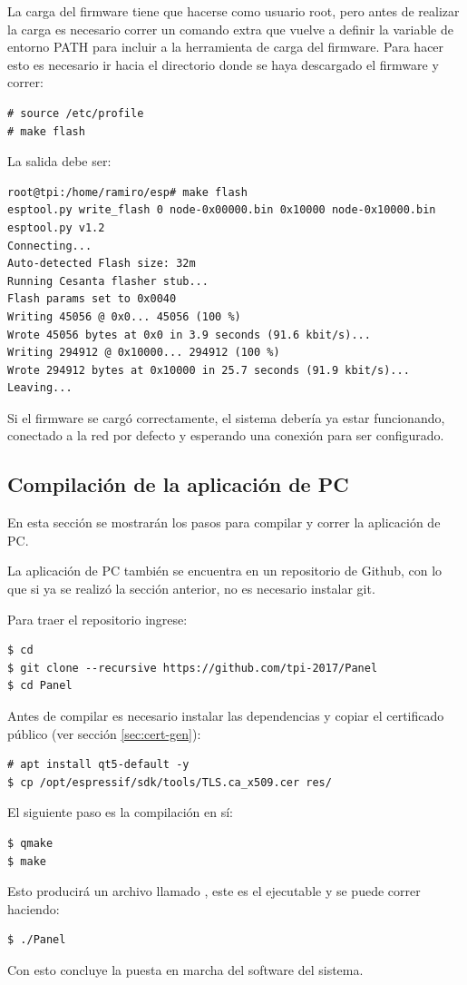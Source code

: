 La carga del firmware tiene que hacerse como usuario root, pero antes de realizar la carga es necesario correr un comando extra que vuelve a definir la variable de entorno PATH para incluir a la herramienta de carga del firmware.
Para hacer esto es necesario ir hacia el directorio donde se haya descargado el firmware y correr:
\begin{lstlisting}
# source /etc/profile
# make flash
\end{lstlisting}

La salida debe ser:
\begin{lstlisting}
root@tpi:/home/ramiro/esp# make flash
esptool.py write_flash 0 node-0x00000.bin 0x10000 node-0x10000.bin
esptool.py v1.2
Connecting...
Auto-detected Flash size: 32m
Running Cesanta flasher stub...
Flash params set to 0x0040
Writing 45056 @ 0x0... 45056 (100 %)
Wrote 45056 bytes at 0x0 in 3.9 seconds (91.6 kbit/s)...
Writing 294912 @ 0x10000... 294912 (100 %)
Wrote 294912 bytes at 0x10000 in 25.7 seconds (91.9 kbit/s)...
Leaving...
\end{lstlisting}

Si el firmware se cargó correctamente, el sistema debería ya estar funcionando, conectado a la red por defecto y esperando una conexión para ser configurado.

\subsection{Compilación de la aplicación de PC}
En esta sección se mostrarán los pasos para compilar y correr la aplicación de PC.

La aplicación de PC también se encuentra en un repositorio de Github, con lo que si ya se realizó la sección anterior, no es necesario instalar git.

Para traer el repositorio ingrese:
\begin{lstlisting}
$ cd
$ git clone --recursive https://github.com/tpi-2017/Panel
$ cd Panel
\end{lstlisting}

Antes de compilar es necesario instalar las dependencias y copiar el certificado público (ver sección \ref{sec:cert-gen}):

\begin{lstlisting}
# apt install qt5-default -y
$ cp /opt/espressif/sdk/tools/TLS.ca_x509.cer res/
\end{lstlisting}

El siguiente paso es la compilación en sí:

\begin{lstlisting}
$ qmake
$ make
\end{lstlisting}

Esto producirá un archivo llamado , este es el ejecutable y se puede correr haciendo:

\begin{lstlisting}
$ ./Panel
\end{lstlisting}

Con esto concluye la puesta en marcha del software del sistema.